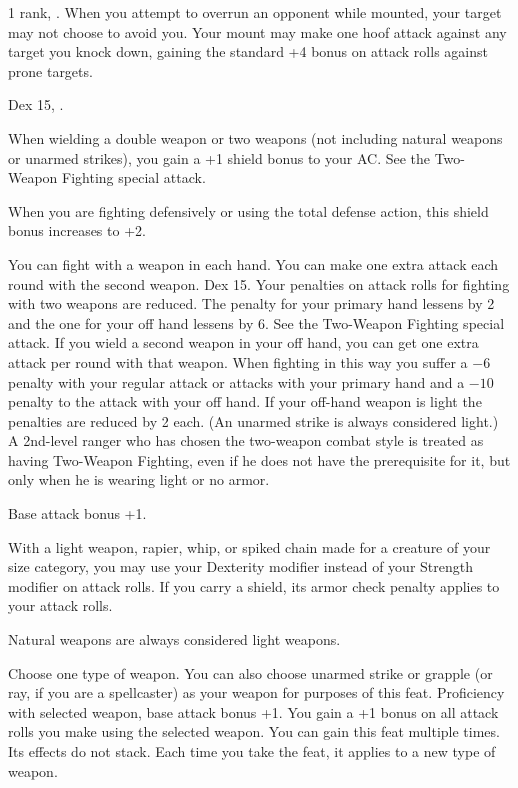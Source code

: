 { 1 rank, .}
{When you attempt to overrun an opponent while mounted, your target may not choose to avoid you. Your mount may make one hoof attack against any target you knock down, gaining the standard +4 bonus on attack rolls against prone targets.}

{Dex 15, .}
{When wielding a double weapon or two weapons (not including natural weapons or unarmed strikes), you gain a +1 shield bonus to your AC. See the Two-Weapon Fighting special attack.

When you are fighting defensively or using the total defense action, this shield bonus increases to +2.}

{You can fight with a weapon in each hand. You can make one extra attack each round with the second weapon.}
{Dex 15.}
{Your penalties on attack rolls for fighting with two weapons are reduced. The penalty for your primary hand lessens by 2 and the one for your off hand lessens by 6. See the Two-Weapon Fighting special attack.}
{If you wield a second weapon in your off hand, you can get one extra attack per round with that weapon. When fighting in this way you suffer a $-6$ penalty with your regular attack or attacks with your primary hand and a $-10$ penalty to the attack with your off hand. If your off-hand weapon is light the penalties are reduced by 2 each. (An unarmed strike is always considered light.)}
{A 2nd-level ranger who has chosen the two-weapon combat style is treated as having Two-Weapon Fighting, even if he does not have the prerequisite for it, but only when he is wearing light or no armor.}

{Base attack bonus +1.}
{With a light weapon, rapier, whip, or spiked chain made for a creature of your size category, you may use your Dexterity modifier instead of your Strength modifier on attack rolls. If you carry a shield, its armor check penalty applies to your attack rolls.

Natural weapons are always considered light weapons.}

{Choose one type of weapon. You can also choose unarmed strike or grapple (or ray, if you are a spellcaster) as your weapon for purposes of this feat.}
{Proficiency with selected weapon, base attack bonus +1.}
{You gain a +1 bonus on all attack rolls you make using the selected weapon.}{}
{You can gain this feat multiple times. Its effects do not stack. Each time you take the feat, it applies to a new type of weapon.}

